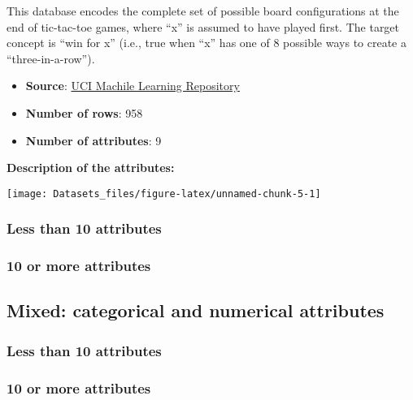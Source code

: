 \documentclass[]{article}
\providecommand{\tightlist}{%
  \setlength{\itemsep}{0pt}\setlength{\parskip}{0pt}}
\begin{document}
This database encodes the complete set of possible board configurations
at the end of tic-tac-toe games, where ``x'' is assumed to have played
first. The target concept is ``win for x'' (i.e., true when ``x'' has
one of 8 possible ways to create a ``three-in-a-row'').

\begin{itemize}
\tightlist
\item
  \textbf{Source}:
  \href{http://archive.ics.uci.edu/ml/datasets/Tic-Tac-Toe+Endgame}{UCI
  Machile Learning Repository}
\item
  \textbf{Number of rows}: 958
\item
  \textbf{Number of attributes}: 9
\end{itemize}

\textbf{Description of the attributes:}

\texttt{[image: Datasets\_files/figure-latex/unnamed-chunk-5-1]}

\hypertarget{less-than-10-attributes}{%
\subsubsection{Less than 10 attributes}\label{less-than-10-attributes}}

\hypertarget{or-more-attributes}{%
\subsubsection{10 or more attributes}\label{or-more-attributes}}

\hypertarget{mixed-categorical-and-numerical-attributes}{%
\subsection{Mixed: categorical and numerical
attributes}\label{mixed-categorical-and-numerical-attributes}}

\hypertarget{less-than-10-attributes-1}{%
\subsubsection{Less than 10
attributes}\label{less-than-10-attributes-1}}

\hypertarget{or-more-attributes-1}{%
\subsubsection{10 or more attributes}\label{or-more-attributes-1}}
\end{document}
